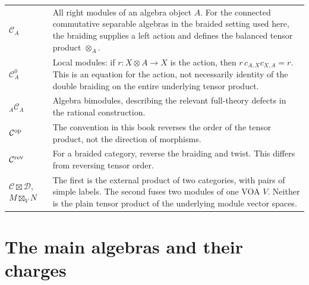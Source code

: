 \begin{longtable}{p{}p{}}
$\mathcal C_A$&All right modules of an algebra object $A$.
For the connected commutative separable algebras in the braided
setting used here, the braiding supplies a left action and
defines the balanced tensor product $\otimes_A$.\\
$\mathcal C_A^0$&Local modules: if $r:X\otimes A\to X$ is
the action, then $r\,c_{A,X}c_{X,A}=r$. This is an equation
for the action, not necessarily identity of the double
braiding on the entire underlying tensor product.\\
${}_A\mathcal C_A$&Algebra bimodules, describing the relevant
full-theory defects in the rational construction.\\
$\mathcal C^{\rm op}$&The convention in this book reverses
the order of the tensor product, not the direction of
morphisms.\\
$\mathcal C^{\rm rev}$&For a braided category, reverse the
braiding and twist. This differs from reversing tensor order.\\
$\mathcal C\boxtimes\mathcal D$, $M\boxtimes_V N$&The first is
the external product of two categories, with pairs of simple labels.
The second fuses two modules of one VOA $V$. Neither is the plain
tensor product of the underlying module vector spaces.\\
\bottomrule
\end{longtable}

\section{The main algebras and their charges}

